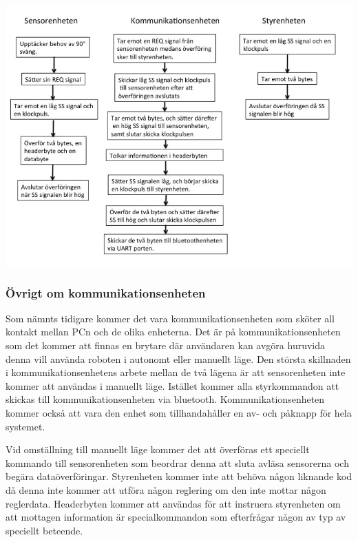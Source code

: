 \includegraphics[angle=0,scale=0.5]{bilder/Schema_exempel.png}

\subsubsection{Övrigt om kommunikationsenheten}

Som nämnts tidigare kommer det vara kommunikationsenheten som sköter all kontakt mellan PCn och de olika enheterna. Det är på kommunikationsenheten som det kommer att finnas en brytare där användaren kan avgöra huruvida denna vill använda roboten i autonomt eller manuellt läge. Den största skillnaden i kommunikationsenhetens arbete mellan de två lägena är att sensorenheten inte kommer att användas i manuellt läge. Istället kommer alla styrkommandon att skickas till kommunikationsenheten via bluetooth. Kommunikationsenheten kommer också att vara den enhet som tillhandahåller en av- och påknapp för hela systemet.

Vid omställning till manuellt läge kommer det att överföras ett speciellt kommando till sensorenheten som beordrar denna att sluta avläsa sensorerna och begära dataöverföringar. Styrenheten kommer inte att behöva någon liknande kod då denna inte kommer att utföra någon reglering om den inte mottar någon reglerdata. Headerbyten kommer att användas för att instruera styrenheten om att mottagen information är specialkommandon som efterfrågar någon av typ av speciellt beteende.

